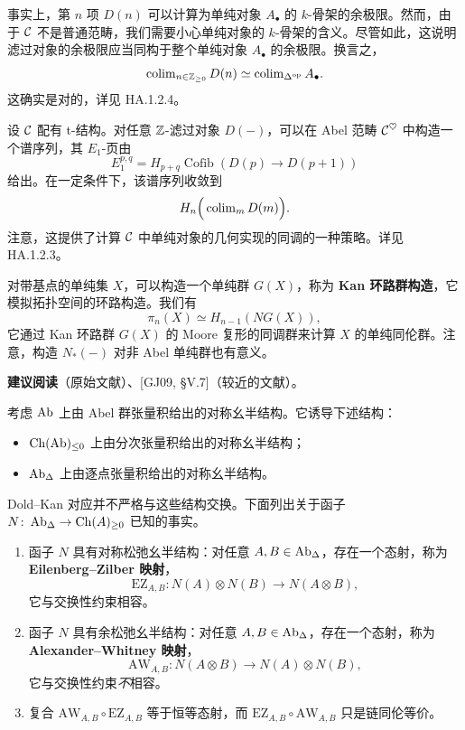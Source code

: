 \begin{remark}\label{L18-4.4}
事实上，第 $n$ 项 $D(n)$ 可以计算为单纯对象 $A_{\bullet}$ 的 $k$-骨架的余极限。然而，由于 $\mathcal{C}$ 不是普通范畴，我们需要小心单纯对象的 $k$-骨架的含义。尽管如此，这说明滤过对象的余极限应当同构于整个单纯对象 $A_{\bullet}$ 的余极限。换言之，
\[
\operatorname{colim}_{n\in\mathbb{Z}_{\ge 0}}D(n)\simeq\operatorname{colim}_{\Delta^{\mathrm{op}}}A_{\bullet}.
\]
这确实是对的，详见 HA.1.2.4。
\end{remark}

\begin{remark}\label{L18-4.5}
设 $\mathcal{C}$ 配有 t-结构。对任意 $\mathbb{Z}$-滤过对象 $D(-)$，可以在 Abel 范畴 $\mathcal{C}^{\heartsuit}$ 中构造一个谱序列，其 $E_{1}$-页由
\[
E^{p,q}_{1}=H_{p+q}\operatorname{Cofib}(D(p)\to D(p+1))
\]
给出。在一定条件下，该谱序列收敛到
\[
H_{n}\Big(\operatorname{colim}_{m}D(m)\Big).
\]
注意，这提供了计算 $\mathcal{C}$ 中单纯对象的几何实现的同调的一种策略。详见 HA.1.2.3。
\end{remark}


\nitem\label{L18-A.1} 对带基点的单纯集 $X$，可以构造一个单纯群 $G(X)$，称为 \textbf{Kan 环路群构造}，它模拟拓扑空间的环路构造。我们有
\[
\pi_{n}(X)\simeq H_{n-1}(NG(X)),
\]
它通过 Kan 环路群 $G(X)$ 的 Moore 复形的同调群来计算 $X$ 的单纯同伦群。注意，构造 $N_{*}(-)$ 对非 Abel 单纯群也有意义。

\nitem\label{L18-A.2} \textbf{建议阅读}\quad [Kan58]（原始文献）、[GJ09, §V.7]（较近的文献）。


\nitem\label{L18-B.1} 考虑 $\operatorname{Ab}$ 上由 Abel 群张量积给出的对称幺半结构。它诱导下述结构：
\begin{itemize}[leftmargin=2.2em,itemsep=0.1em]
\item $\operatorname{Ch}(\operatorname{Ab})_{\le 0}$ 上由分次张量积给出的对称幺半结构；
\item $\operatorname{Ab}_{\Delta}$ 上由逐点张量积给出的对称幺半结构。
\end{itemize}
Dold–Kan 对应并不严格与这些结构交换。下面列出关于函子 $N\colon\operatorname{Ab}_{\Delta}\to\operatorname{Ch}(A)_{\ge 0}$ 已知的事实。
\begin{enumerate}[label=(\roman*),leftmargin=2.4em,itemsep=0.1em]
\item 函子 $N$ 具有对称松弛幺半结构：对任意 $A,B\in\operatorname{Ab}_{\Delta}$，存在一个态射，称为 \textbf{Eilenberg–Zilber 映射}，
\[
\mathrm{EZ}_{A,B}\colon N(A)\otimes N(B)\to N(A\otimes B),
\]
它与交换性约束相容。
\item 函子 $N$ 具有余松弛幺半结构：对任意 $A,B\in\operatorname{Ab}_{\Delta}$，存在一个态射，称为 \textbf{Alexander–Whitney 映射}，
\[
\mathrm{AW}_{A,B}\colon N(A\otimes B)\to N(A)\otimes N(B),
\]
它与交换性约束\emph{不}相容。
\item 复合 $\mathrm{AW}_{A,B}\circ\mathrm{EZ}_{A,B}$ 等于恒等态射，而 $\mathrm{EZ}_{A,B}\circ\mathrm{AW}_{A,B}$ 只是链同伦等价。
\end{enumerate}

